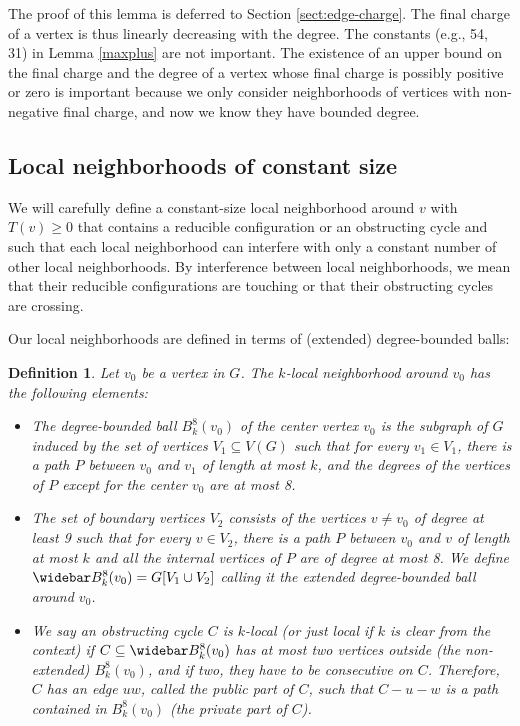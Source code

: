 \documentclass[10pt,a4paper]{article}
\newtheorem{dfn}[thm]{Definition}
\renewcommand{\bar}{\widebar}
\def\showlabel#1{}
\begin{document}
The proof of this lemma is deferred to Section \ref{sect:edge-charge}.
The final charge of a vertex is thus linearly decreasing with the degree.
The constants (e.g., 54, 31) in Lemma \ref{maxplus} are not important. The existence of an upper bound on the final charge and the degree of a vertex whose final charge is possibly positive or zero is important because we only consider neighborhoods of vertices with non-negative final charge, and now we know they have bounded degree.



\subsection{Local neighborhoods of constant size}

We will carefully define a constant-size local neighborhood around $v$ with $T(v)\geq 0$ that contains a reducible configuration or
an obstructing cycle and such that each local neighborhood can interfere with only a constant number of other local neighborhoods. By interference between local neighborhoods, we mean that their reducible configurations are touching or that their obstructing cycles are crossing.

Our local neighborhoods are defined in terms of (extended) degree-bounded balls:

\begin{dfn}\label{def:limitcart}\showlabel{def:limitcart}
 Let $v_0$ be a vertex in $G$. The \emph{$k$-local neighborhood} around $v_0$ has the following elements:
\begin{itemize}
\item 
The \emph{degree-bounded ball} $B_k^8(v_0)$ of the \emph{center vertex} $v_0$ is the  subgraph of $G$ induced by the set of vertices $V_1 \subseteq V(G)$ such that 
for every $v_1 \in V_1$, there is a path $P$ between $v_0$ and $v_1$ of length at most $k$, and the degrees of the vertices of $P$ except for the center $v_0$ are at most 8. 
\item 

The set of \emph{boundary vertices} $V_2$ consists of the vertices $v\ne v_0$ of degree at least 9 such that for every $v \in V_2$, there is a path $P$ between $v_0$ and $v$ of length at most $k$ and all the internal vertices of $P$ are of degree at most 8. We define $\bar B_k^8(v_0) = G[V_1 \cup V_2]$ calling it the \emph{extended degree-bounded ball} around $v_0$.
\item 
We say an obstructing cycle $C$ is \emph{$k$-local} 
(or just \emph{local} if $k$ is clear from the context) if $C\subseteq \bar B_k^8(v_0)$ has at most
two vertices outside (the non-extended) $B_{k}^8(v_0)$, and if two, they have to be consecutive on $C$. Therefore, $C$ has an edge $uw$, called the \emph{public part} of $C$, such that $C-u-w$ is a path contained in $B_{k}^8(v_0)$ (the \emph{private part} of $C$).
\end{itemize}
\end{dfn}
\end{document}
